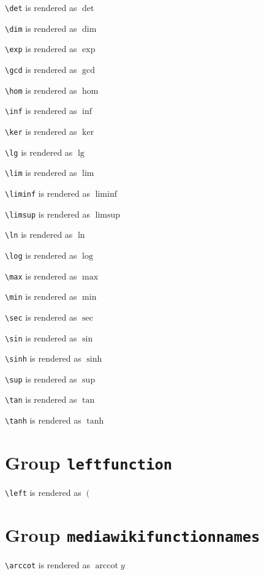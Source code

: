 \texttt{\textbackslash det} is rendered as $\det$

\texttt{\textbackslash dim} is rendered as $\dim$

\texttt{\textbackslash exp} is rendered as $\exp$

\texttt{\textbackslash gcd} is rendered as $\gcd$

\texttt{\textbackslash hom} is rendered as $\hom$

\texttt{\textbackslash inf} is rendered as $\inf$

\texttt{\textbackslash ker} is rendered as $\ker$

\texttt{\textbackslash lg} is rendered as $\lg$

\texttt{\textbackslash lim} is rendered as $\lim$

\texttt{\textbackslash liminf} is rendered as $\liminf$

\texttt{\textbackslash limsup} is rendered as $\limsup$

\texttt{\textbackslash ln} is rendered as $\ln$

\texttt{\textbackslash log} is rendered as $\log$

\texttt{\textbackslash max} is rendered as $\max$

\texttt{\textbackslash min} is rendered as $\min$

\texttt{\textbackslash sec} is rendered as $\sec$

\texttt{\textbackslash sin} is rendered as $\sin$

\texttt{\textbackslash sinh} is rendered as $\sinh$

\texttt{\textbackslash sup} is rendered as $\sup$

\texttt{\textbackslash tan} is rendered as $\tan$

\texttt{\textbackslash tanh} is rendered as $\tanh$

\section{ Group \texttt{left\textunderscore function}}

\texttt{\textbackslash left} is rendered as $\left( \right.$

\section{ Group \texttt{mediawiki\textunderscore function\textunderscore names}}

\texttt{\textbackslash arccot} is rendered as $\operatorname{arccot} y$

